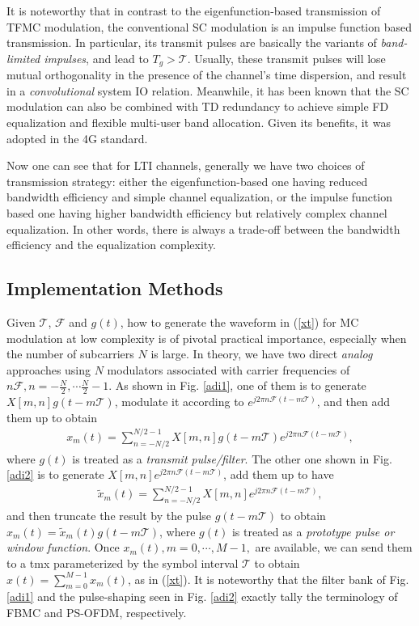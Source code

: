\documentclass[journal]{IEEEtran}
\begin{document}
It is noteworthy that in contrast to the eigenfunction-based transmission of TFMC modulation, the conventional SC modulation is an impulse function based transmission. In particular, its transmit pulses are basically the variants of \emph{band-limited impulses}, and lead to $T_g>\mathcal T$. Usually, these transmit pulses will lose mutual orthogonality in the presence of the channel's time dispersion, and result in a \emph{convolutional} system IO relation. Meanwhile, it has been known that the SC modulation can also be combined with TD redundancy to achieve simple FD equalization\cite{scfde} and flexible multi-user band allocation\cite{goodman_sc_fdma_2006}. Given its benefits, it was adopted in the 4G standard\cite{4Gbook}.

Now one can see that for LTI channels, generally we have two choices of transmission strategy: either the eigenfunction-based one having reduced bandwidth efficiency and simple channel equalization, or the impulse function based one having higher bandwidth efficiency but relatively complex channel equalization.
In other words, there is always a trade-off between the bandwidth efficiency and the equalization complexity.



\subsection{Implementation Methods}\label{tfmc_imple_method}
Given $\mathcal T$, $\mathcal F$ and $g(t)$, how to generate the waveform in (\ref{xt}) for MC modulation at low complexity is of pivotal practical importance, especially when the number of subcarriers $N$ is large. In theory, we have two direct \emph{analog} approaches using $N$ modulators associated with carrier frequencies of $n\mathcal F, n=-\frac{N}{2},\cdots \frac{N}{2}-1$. As shown in Fig. \ref{adi1}, one of them is to generate $X[m,n]g(t-m\mathcal T)$, modulate it according to  $e^{j2\pi n \mathcal F (t-m\mathcal T)}$, and then add them up to obtain
\begin{align}
  x_m(t)=\sum_{n=-N/2}^{N/2-1} X[m,n]g(t-m\mathcal T)e^{j2\pi n \mathcal F (t-m\mathcal T)},
\end{align}
where $g(t)$ is treated as a \emph{transmit pulse/filter}.
The other one shown in Fig. \ref{adi2} is to generate $X[m,n]e^{j2\pi n \mathcal F (t-m\mathcal T)}$, add them up to have
\begin{align}\label{txmt}
  \tilde x_m(t)= \sum_{n=-N/2}^{N/2-1}X[m,n]e^{j2\pi n \mathcal F (t-m\mathcal T)},
\end{align}
and then truncate the result by the pulse $g(t-m\mathcal T)$ to obtain $x_m(t)=\tilde x_m(t) g(t-m\mathcal T)$, where $g(t)$ is treated as a \emph{prototype pulse or window function}. 
Once $x_m(t), m=0,\cdots,M-1,$ are available, we can send them to a \ac{tmx} parameterized by the symbol interval $\mathcal T$ to obtain $x(t)=\sum_{m=0}^{M-1}x_m(t)$, as in (\ref{xt}). It is noteworthy that the filter bank of Fig. \ref{adi1} and the pulse-shaping seen in Fig. \ref{adi2} exactly tally the terminology of FBMC and PS-OFDM, respectively.
\end{document}
